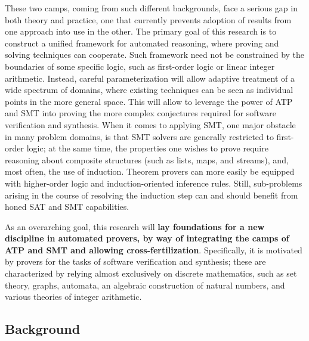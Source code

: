 \smallskip
These two camps, coming from such different backgrounds,
face a serious gap in both theory and practice,
one that currently prevents adoption of results from one approach into use in
the other.
The primary goal of this research is to construct a unified framework for automated reasoning, where proving
and solving techniques can cooperate.
Such framework need not be constrained by the boundaries of some specific logic, such as first-order logic or linear integer arithmetic.
Instead, careful parameterization will allow adaptive treatment of a wide spectrum of domains, where existing techniques can be seen as individual points in the more general space.
This will allow to leverage the power of ATP and SMT into proving the more complex
conjectures required for software verification and synthesis.
When it comes to applying SMT, one major obstacle in many problem domains, is
that SMT solvers are generally restricted to first-order logic; at the same time,
the properties one wishes to prove require reasoning about composite structures (such as lists, maps, and streams), and, most often, the use of induction.
Theorem provers can more easily be equipped with higher-order logic and induction-oriented inference
rules.
Still, sub-problems arising in the course of resolving the induction step can
and should benefit from honed SAT and SMT capabilities.

As an overarching goal, this research will \textbf{lay foundations for a new discipline
in automated provers, by way of integrating the camps of ATP and SMT and allowing
cross-fertilization}.
Specifically, it is motivated by provers for the tasks of software verification
and synthesis; these are characterized by relying almost exclusively on discrete
mathematics, such as set theory, graphs, automata, an algebraic construction of
natural numbers, and various theories of integer arithmetic.


\subsection{Background}


